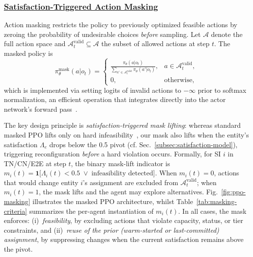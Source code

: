 \documentclass[12pt,lettersize,journal,onecolumn]{IEEEtran}
\begin{document}
\subsubsection{\underline{Satisfaction-Triggered Action Masking}}
Action masking restricts the policy to previously optimized feasible actions by zeroing the probability of undesirable choices \textit{before} sampling. Let $\mathcal{A}$ denote the full action space and $\mathcal{A}^{\text{valid}}_t\subseteq\mathcal{A}$ the subset of allowed actions at step $t$. The masked policy is
$$ %
\pi^{\text{mask}}_\theta(a|o_t) =
\begin{cases}
\displaystyle\frac{\pi_\theta(a|o_t)}{\sum_{a'\in\mathcal{A}^{\text{valid}}_t}\pi_\theta(a'|o_t)}, & a\in\mathcal{A}^{\text{valid}}_t,\\[1.5ex]
0, & \text{otherwise},
\end{cases}
$$
which is implemented via setting logits of invalid actions to $-\infty$ prior to softmax normalization, an efficient operation that integrates directly into the actor network's forward pass~\cite{flairs22huang}. %

The key design principle is \emph{satisfaction-triggered mask lifting}: whereas standard masked PPO lifts only on hard infeasibility~\cite{flairs22huang}, our mask also lifts when the entity's satisfaction $\Lambda_e$ drops below the 0.5 pivot (cf. Sec.~\ref{subsec:satisfaction-model}), triggering reconfiguration \emph{before} a hard violation occurs. Formally, for SI $i$ in TN/CN/E2E at step $t$, the binary mask-lift indicator is $m_i(t)=\mathbf{1}\bigl[\Lambda_i(t)<0.5\;\lor\;\text{infeasibility detected}\bigr]$. 
When $m_i(t)=0$, actions that would change entity $i$'s assignment are excluded from $\mathcal{A}^{\text{valid}}_t$; when $m_i(t)=1$, the mask lifts and the agent may explore alternatives. Fig.~\ref{fig:ppo-masking} illustrates the masked PPO architecture, whilst Table~\ref{tab:masking-criteria} summarizes the per-agent instantiation of $m_i(t)$. In all cases, the mask enforces: (i)~\textit{feasibility}, by excluding actions that violate capacity, status, or tier constraints, and (ii)~\textit{reuse of the prior (warm-started or last-committed) assignment}, by suppressing changes when the current satisfaction remains above the pivot. %
\end{document}
